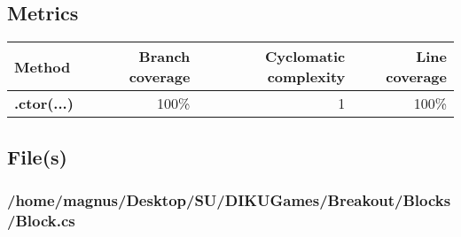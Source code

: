 \documentclass[a4paper,landscape,10pt]{article}
\begin{document}
\subsection{Metrics}
\begin{longtable}[l]{|l|r|r|r|}
\hline
\textbf{Method} & \textbf{Branch coverage} & \textbf{Cyclomatic complexity} & \textbf{Line coverage}\\
\hline
\textbf{.ctor(...)} & 100\% & 1 & 100\%\\
\hline
\end{longtable}
\subsection{File(s)}
\subsubsection{/home/magnus/Desktop/SU/DIKUGames/Breakout/Blocks/Block.cs}
\end{document}
